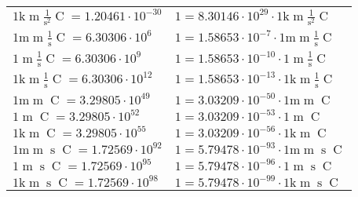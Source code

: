 \begin{center}
\begin{longtable}{l l}
{\color{gray}$1 \bm{\mathrm{ k}}{\operatorname{m}}\frac1{\operatorname{s}^2}{\operatorname{C}}{} = 1.20461\cdot10^{-30} $}   & {\color{gray}$ 1 = 8.30146\cdot10^{29} \cdot 1 \bm{\mathrm{ k}}{\operatorname{m}}\frac1{\operatorname{s}^2}{\operatorname{C}}{}$}  \\
{\color{gray}$1 \bm{\mathrm{ m}}{\operatorname{m}}\frac1{\operatorname{s}}{\operatorname{C}}{} = 6.30306\cdot10^{6} $}   & {\color{gray}$ 1 = 1.58653\cdot10^{-7} \cdot 1 \bm{\mathrm{ m}}{\operatorname{m}}\frac1{\operatorname{s}}{\operatorname{C}}{}$}  \\
{\color{black}$1 \bm{\mathrm{ }}{\operatorname{m}}\frac1{\operatorname{s}}{\operatorname{C}}{} = 6.30306\cdot10^{9} $}   & {\color{black}$ 1 = 1.58653\cdot10^{-10} \cdot 1 \bm{\mathrm{ }}{\operatorname{m}}\frac1{\operatorname{s}}{\operatorname{C}}{}$}  \\
{\color{gray}$1 \bm{\mathrm{ k}}{\operatorname{m}}\frac1{\operatorname{s}}{\operatorname{C}}{} = 6.30306\cdot10^{12} $}   & {\color{gray}$ 1 = 1.58653\cdot10^{-13} \cdot 1 \bm{\mathrm{ k}}{\operatorname{m}}\frac1{\operatorname{s}}{\operatorname{C}}{}$}  \\
{\color{gray}$1 \bm{\mathrm{ m}}{\operatorname{m}}{}{\operatorname{C}}{} = 3.29805\cdot10^{49} $}   & {\color{gray}$ 1 = 3.03209\cdot10^{-50} \cdot 1 \bm{\mathrm{ m}}{\operatorname{m}}{}{\operatorname{C}}{}$}  \\
{\color{black}$1 \bm{\mathrm{ }}{\operatorname{m}}{}{\operatorname{C}}{} = 3.29805\cdot10^{52} $}   & {\color{black}$ 1 = 3.03209\cdot10^{-53} \cdot 1 \bm{\mathrm{ }}{\operatorname{m}}{}{\operatorname{C}}{}$}  \\
{\color{gray}$1 \bm{\mathrm{ k}}{\operatorname{m}}{}{\operatorname{C}}{} = 3.29805\cdot10^{55} $}   & {\color{gray}$ 1 = 3.03209\cdot10^{-56} \cdot 1 \bm{\mathrm{ k}}{\operatorname{m}}{}{\operatorname{C}}{}$}  \\
{\color{gray}$1 \bm{\mathrm{ m}}{\operatorname{m}}{\operatorname{s}}{\operatorname{C}}{} = 1.72569\cdot10^{92} $}   & {\color{gray}$ 1 = 5.79478\cdot10^{-93} \cdot 1 \bm{\mathrm{ m}}{\operatorname{m}}{\operatorname{s}}{\operatorname{C}}{}$}  \\
{\color{black}$1 \bm{\mathrm{ }}{\operatorname{m}}{\operatorname{s}}{\operatorname{C}}{} = 1.72569\cdot10^{95} $}   & {\color{black}$ 1 = 5.79478\cdot10^{-96} \cdot 1 \bm{\mathrm{ }}{\operatorname{m}}{\operatorname{s}}{\operatorname{C}}{}$}  \\
{\color{gray}$1 \bm{\mathrm{ k}}{\operatorname{m}}{\operatorname{s}}{\operatorname{C}}{} = 1.72569\cdot10^{98} $}   & {\color{gray}$ 1 = 5.79478\cdot10^{-99} \cdot 1 \bm{\mathrm{ k}}{\operatorname{m}}{\operatorname{s}}{\operatorname{C}}{}$}  \\

\end{longtable}
\end{center}
